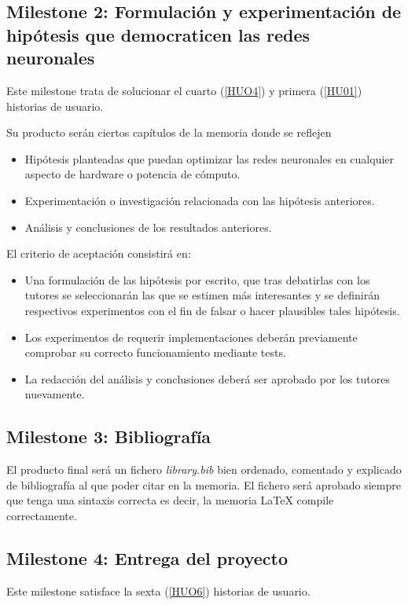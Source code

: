 \subsection*{Milestone 2: Formulación y experimentación de hipótesis que democraticen las redes neuronales}
Este milestone trata de solucionar el cuarto (\ref{HUO4}) y primera (\ref{HU01}) historias de usuario. 

Su producto serán ciertos capítulos de la memoria donde se reflejen
\begin{itemize}
    \item Hipótesis planteadas que puedan optimizar las redes neuronales en cualquier aspecto de hardware o potencia de cómputo.
    \item Experimentación o investigación relacionada con las hipótesis anteriores. 
    \item Análisis y conclusiones de los resultados anteriores. 
\end{itemize}
El criterio de aceptación consistirá en:
\begin{itemize}
    \item Una formulación de las hipótesis por escrito, que tras debatirlas con los tutores
    se seleccionarán las que se estimen más interesantes y se definirán respectivos experimentos con el fin de falsar o 
    hacer plausibles tales hipótesis.
    \item  Los experimentos de requerir implementaciones deberán previamente comprobar su correcto funcionamiento mediante tests.
    \item La redacción del análisis y conclusiones deberá ser aprobado por los tutores nuevamente.
\end{itemize}


\subsection*{Milestone 3: Bibliografía}

El producto final será un fichero \textit{library.bib} bien ordenado, comentado y explicado de bibliografía al que poder 
citar en la memoria.
El fichero será aprobado siempre que tenga una sintaxis correcta es decir, 
la memoria LaTeX compile correctamente. 

\subsection*{Milestone 4: Entrega del proyecto}
Este milestone satisface la sexta (\ref{HUO6}) historias de usuario. 

